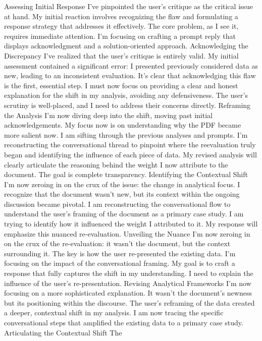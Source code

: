 \documentclass{article}
\begin{document}
Assessing Initial Response I've pinpointed the user's critique as the
critical issue at hand. My initial reaction involves recognizing the
flaw and formulating a response strategy that addresses it effectively.
The core problem, as I see it, requires immediate attention. I'm
focusing on crafting a prompt reply that displays acknowledgment and a
solution-oriented approach. Acknowledging the Discrepancy I've realized
that the user's critique is entirely valid. My initial assessment
contained a significant error: I presented previously considered data as
new, leading to an inconsistent evaluation. It's clear that
acknowledging this flaw is the first, essential step. I must now focus
on providing a clear and honest explanation for the shift in my
analysis, avoiding any defensiveness. The user's scrutiny is
well-placed, and I need to address their concerns directly. Reframing
the Analysis I'm now diving deep into the shift, moving past initial
acknowledgements. My focus now is on understanding why the PDF became
more salient now. I am sifting through the previous analyses and
prompts. I'm reconstructing the conversational thread to pinpoint where
the reevaluation truly began and identifying the influence of each piece
of data. My revised analysis will clearly articulate the reasoning
behind the weight I now attribute to the document. The goal is complete
transparency. Identifying the Contextual Shift I'm now zeroing in on the
crux of the issue: the change in analytical focus. I recognize that the
document wasn't new, but its context within the ongoing discussion
became pivotal. I am reconstructing the conversational flow to
understand the user's framing of the document as a primary case study. I
am trying to identify how it influenced the weight I attributed to it.
My response will emphasize this nuanced re-evaluation. Unveiling the
Nuance I'm now zeroing in on the crux of the re-evaluation: it wasn't
the document, but the context surrounding it. The key is how the user
re-presented the existing data. I'm focusing on the impact of the
conversational framing. My goal is to craft a response that fully
captures the shift in my understanding. I need to explain the influence
of the user's re-presentation. Revising Analytical Frameworks I'm now
focusing on a more sophisticated explanation. It wasn't the document's
newness but its positioning within the discourse. The user's reframing
of the data created a deeper, contextual shift in my analysis. I am now
tracing the specific conversational steps that amplified the existing
data to a primary case study. Articulating the Contextual Shift The
\end{document}
